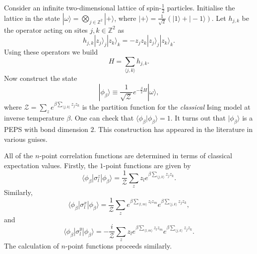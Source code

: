 \documentclass[prl,twocolumn,lengthcheck,superscriptaddress]{revtex4-1}
\theoremstyle{definition}
\theoremstyle{remark}
\begin{document}
Consider an infinite two-dimensional lattice of spin-$\frac12$ particles. Initialise the lattice in the state $|\omega\rangle = \bigotimes_{j\in \mathbb{Z}^2} |+\rangle$, where $|+\rangle = \frac{1}{\sqrt{2}}(|1\rangle + |-1\rangle)$. Let $h_{j,k}$ be the operator acting on sites $j, k\in \mathbb{Z}^2$ as 
\begin{equation}
	h_{j,k}|z_j\rangle_j|z_k\rangle_k = -z_jz_k|z_j\rangle_j|z_k\rangle_k.
\end{equation}
Using these operators we build 
\begin{equation}
	H = \sum_{\langle j, k\rangle} h_{j,k}.
\end{equation}
Now construct the state
\begin{equation}
	|\phi_{\beta}\rangle \equiv \frac{1}{\sqrt{\mathcal{Z}}} e^{-\frac{\beta}{2} H} |\omega\rangle,
\end{equation}
where $\mathcal{Z} = \sum_{z} e^{\beta \sum_{\langle j, k\rangle} z_jz_k}$ is the partition function for the \emph{classical} Ising model at inverse temperature $\beta$. One can check that $\langle \phi_\beta|\phi_\beta\rangle = 1$. It turns out \cite{verstraete:2006a} that $|\phi_\beta\rangle$ is a PEPS with bond dimension $2$. This construction has appeared in the literature in various guises.

All of the $n$-point correlation functions are determined in terms of classical expectation values. Firstly, the $1$-point functions are given by
\begin{equation}
	\langle \phi_\beta|\sigma^z_l|\phi_\beta\rangle = \frac{1}{\mathcal{Z}}\sum_{z} z_le^{\beta \sum_{\langle j, k\rangle} z_jz_k}.
\end{equation}
Similarly,
\begin{equation}
	\langle \phi_\beta|\sigma^x_l|\phi_\beta\rangle = \frac{1}{\mathcal{Z}}\sum_{z}  e^{\beta\sum_{\langle l,m\rangle} z_lz_m} e^{\beta \sum_{\langle j, k\rangle} z_jz_k},
\end{equation}
and
\begin{equation}
	\langle \phi_\beta|\sigma^y_l|\phi_\beta\rangle = -\frac{i}{\mathcal{Z}}\sum_{z} z_l e^{\beta\sum_{\langle l,m\rangle} z_lz_m} e^{\beta \sum_{\langle j, k\rangle} z_jz_k}.
\end{equation}
The calculation of $n$-point functions proceeds similarly.
\end{document}
